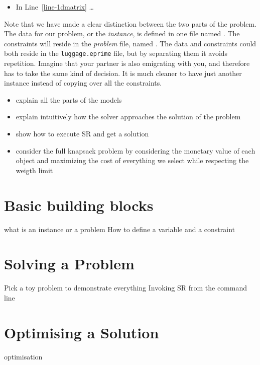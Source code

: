 \begin{itemize}
    \item In Line~\ref{line-1dmatrix} \dots
\end{itemize}        

Note that we have made a clear distinction between the two parts of the problem.
The data for our problem, or the \emph{instance}, is defined in one file named
. The constraints will reside in the \emph{problem} file,
named . The data and constraints could both reside in the
\texttt{luggage.eprime} file, but by separating them it avoids repetition.
Imagine that your partner is also emigrating with you, and therefore
has to take the same kind of decision. It is much cleaner to have just another instance
instead of copying over all the constraints.


\begin{itemize}
\item explain all the parts of the models
\item explain intuitively how the solver approaches the solution of the problem
\item show how to execute SR and get a solution
\item consider the full knapsack problem by considering the monetary value of each object
and maximizing the cost of everything we select while respecting the weigth limit
\end{itemize}

\section{Basic building blocks}
 what is an instance or a problem
How to define a variable and a constraint

\section{Solving a Problem}
Pick a toy problem to demonstrate everything
Invoking SR from the command line

\section{Optimising a Solution}
optimisation



